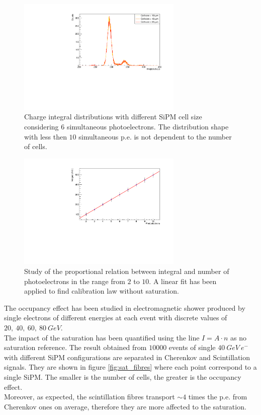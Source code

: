 \begin{figure}
	\centering
	\includegraphics[width=0.7\textwidth]{IMG/Cap5/6pe_sat}
	\caption{Charge integral distributions with different SiPM cell size considering $6$ simultaneous photoelectrons. The distribution shape with less then $10$ simultaneous p.e. is not dependent to the number of cells.}
	\label{fig:SatCheck}
\end{figure}

\begin{figure}
	\centering
	\includegraphics[width=0.7\textwidth]{IMG/Cap5/NoSatLine}
	\caption{Study of the proportional relation between integral and number of photoelectrons in the range from $2$ to $10$. A linear fit has been applied to find calibration law without saturation.}
	\label{fig:NoSatLine}
\end{figure}

The occupancy effect has been studied in electromagnetic shower produced by single electrons of different energies at each event with discrete values of $20,\ 40,\ 60,\ 80\ GeV$.\\
The impact of the saturation has been quantified using the line $I = A\cdot n$ as no saturation reference. The result obtained from $10000$ events of single $40\ GeV\ e^-$ with different SiPM configurations are separated in Cherenkov and Scintillation signals. They are shown in figure \ref{fig:sat_fibres} where each point correspond to a single SiPM. The smaller is the number of cells, the greater is the occupancy effect.\\
Moreover, as expected, the scintillation fibres transport $\sim 4$ times the p.e. from Cherenkov ones on average, therefore they are more affected to the saturation.\\


